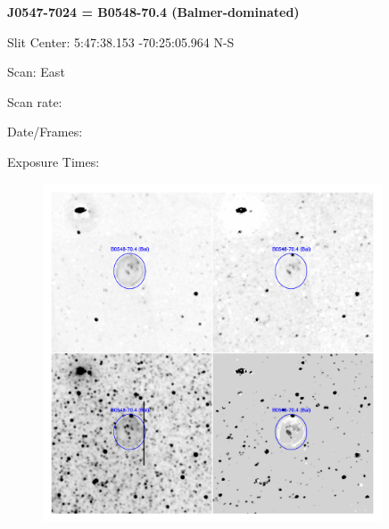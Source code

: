 \documentclass[11pt]{article}
\begin{document}
\newpage 
 
{\bf J0547-7024 = B0548-70.4 (Balmer-dominated)}

Slit Center:  5:47:38.153   -70:25:05.964  N-S

Scan:  East

Scan rate:  

Date/Frames:

Exposure Times:  

\begin{figure}
\includegraphics[width=10.05cm]{snapshots/B0548-704.png}
\end{figure}
\end{document}
